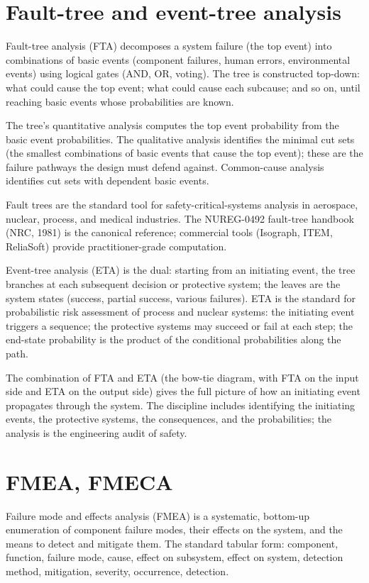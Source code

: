 \section{Fault-tree and event-tree analysis}

Fault-tree analysis (FTA) decomposes a system failure (the top event) into combinations of basic events (component failures, human errors, environmental events) using logical gates (AND, OR, voting). The tree is constructed top-down: what could cause the top event; what could cause each subcause; and so on, until reaching basic events whose probabilities are known.

The tree's quantitative analysis computes the top event probability from the basic event probabilities. The qualitative analysis identifies the minimal cut sets (the smallest combinations of basic events that cause the top event); these are the failure pathways the design must defend against. Common-cause analysis identifies cut sets with dependent basic events.

Fault trees are the standard tool for safety-critical-systems analysis in aerospace, nuclear, process, and medical industries. The NUREG-0492 fault-tree handbook (NRC, 1981) is the canonical reference; commercial tools (Isograph, ITEM, ReliaSoft) provide practitioner-grade computation.

Event-tree analysis (ETA) is the dual: starting from an initiating event, the tree branches at each subsequent decision or protective system; the leaves are the system states (success, partial success, various failures). ETA is the standard for probabilistic risk assessment of process and nuclear systems: the initiating event triggers a sequence; the protective systems may succeed or fail at each step; the end-state probability is the product of the conditional probabilities along the path.

The combination of FTA and ETA (the bow-tie diagram, with FTA on the input side and ETA on the output side) gives the full picture of how an initiating event propagates through the system. The discipline includes identifying the initiating events, the protective systems, the consequences, and the probabilities; the analysis is the engineering audit of safety.

\section{FMEA, FMECA}

Failure mode and effects analysis (FMEA) is a systematic, bottom-up enumeration of component failure modes, their effects on the system, and the means to detect and mitigate them. The standard tabular form: component, function, failure mode, cause, effect on subsystem, effect on system, detection method, mitigation, severity, occurrence, detection.


